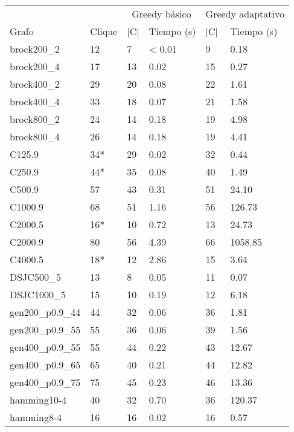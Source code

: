 \begin{small}
\begin{longtable}{l l l l l l}
  \label{table:greedy}\\
  & & \multicolumn{2}{c}{Greedy básico} & \multicolumn{2}{c}{Greedy adaptativo} \\ \cline{3-6}
  Grafo              & Clique & |C| & Tiempo (s) & |C| & Tiempo (s) \\ \hline
  \endhead
  \endfoot
  brock200\_2        & 12 & 7 & < 0.01 & 9 & 0.18 \\ \hline
  brock200\_4        & 17 & 13 & 0.02 & 15 & 0.27 \\ \hline
  brock400\_2        & 29 & 20 & 0.08 & 22 & 1.61 \\ \hline
  brock400\_4        & 33 & 18 & 0.07 & 21 & 1.58 \\ \hline
  brock800\_2        & 24 & 14 & 0.18 & 19 & 4.98 \\ \hline
  brock800\_4        & 26 & 14 & 0.18 & 19 & 4.41 \\ \hline
  C125.9             & 34* & 29 & 0.02 & 32 & 0.44 \\ \hline
  C250.9             & 44* & 35 & 0.08 & 40 & 1.49 \\ \hline
  C500.9             & 57 & 43 & 0.31 & 51 & 24.10 \\ \hline
  C1000.9            & 68 & 51 & 1.16 & 56 & 126.73 \\ \hline
  C2000.5            & 16* & 10 & 0.72 & 13 & 24.73 \\ \hline
  C2000.9            & 80 & 56 & 4.39 & 66 & 1058.85 \\ \hline
  C4000.5            & 18* & 12 & 2.86 & 15 & 3.64 \\ \hline
  DSJC500\_5         & 13 & 8 & 0.05 & 11 & 0.07 \\ \hline
  DSJC1000\_5        & 15 & 10 & 0.19 & 12 & 6.18 \\ \hline
  gen200\_p0.9\_44   & 44 & 32 & 0.06 & 36 & 1.81 \\ \hline
  gen200\_p0.9\_55   & 55 & 36 & 0.06 & 39 & 1.56 \\ \hline
  gen400\_p0.9\_55   & 55 & 44 & 0.22 & 43 & 12.67 \\ \hline
  gen400\_p0.9\_65   & 65 & 40 & 0.21 & 44 & 12.82 \\ \hline
  gen400\_p0.9\_75   & 75 & 45 & 0.23 & 46 & 13.36 \\ \hline
  hamming10-4        & 40 & 32 & 0.70 & 36 & 120.37 \\ \hline
  hamming8-4         & 16 & 16 & 0.02 & 16 & 0.57 \\ \hline

\end{longtable}
\end{small}
